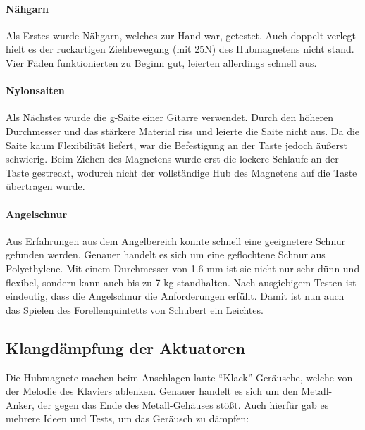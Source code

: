 \paragraph{Nähgarn}

Als Erstes wurde Nähgarn, welches zur Hand war, getestet.
Auch doppelt verlegt hielt es der ruckartigen Ziehbewegung (mit 25N) des Hubmagnetens nicht stand.
Vier Fäden funktionierten zu Beginn gut, leierten allerdings schnell aus.

\paragraph{Nylonsaiten}

Als Nächstes wurde die g-Saite einer Gitarre verwendet.
Durch den höheren Durchmesser und das stärkere Material riss und leierte die Saite nicht aus.
Da die Saite kaum Flexibilität liefert, war die Befestigung an der Taste jedoch äußerst schwierig.
Beim Ziehen des Magnetens wurde erst die lockere Schlaufe an der Taste gestreckt, wodurch nicht der vollständige Hub des Magnetens auf die Taste übertragen wurde.

\paragraph{Angelschnur}

Aus Erfahrungen aus dem Angelbereich konnte schnell eine geeignetere Schnur gefunden werden.
Genauer handelt es sich um eine geflochtene Schnur aus Polyethylene.
Mit einem Durchmesser von 1.6 mm ist sie nicht nur sehr dünn und flexibel, sondern kann auch bis zu 7 kg standhalten.
Nach ausgiebigem Testen ist eindeutig, dass die Angelschnur die Anforderungen erfüllt.
Damit ist nun auch das Spielen des Forellenquintetts von Schubert ein Leichtes.

\subsection{Klangdämpfung der Aktuatoren}


Die Hubmagnete machen beim Anschlagen laute \enquote{Klack} Geräusche, welche von der Melodie des Klaviers ablenken.
Genauer handelt es sich um den Metall-Anker, der gegen das Ende des Metall-Gehäuses stößt.
Auch hierfür gab es mehrere Ideen und Tests, um das Geräusch zu dämpfen:


